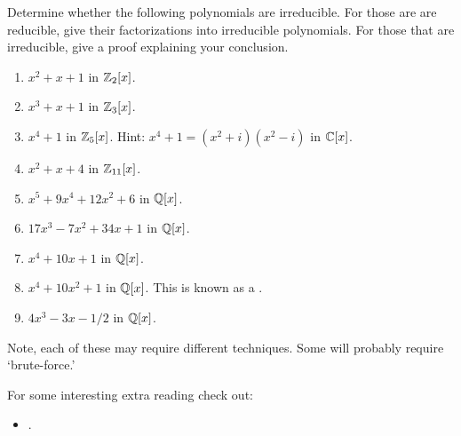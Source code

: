 \documentclass{ximera}
\begin{document}
\begin{exercise}\label{E:manypoly}
  Determine whether the following polynomials are irreducible. For those
  are are reducible, give their factorizations into irreducible
  polynomials. For those that are irreducible, give a proof explaining
  your conclusion.
  \begin{enumerate}
  \item $x^2 + x +1$ in $\mathbb Z_2[x]$.
  \item $x^3 + x + 1$ in $\mathbb Z_3[x]$.
  \item $x^4+1$ in $\mathbb Z_5[x]$. Hint: $x^4+1 = (x^2+i)(x^2-i)$ in
    $\mathbb C[x]$.
  \item $x^2 + x + 4$ in $\mathbb Z_{11}[x]$.
  \item $x^5 + 9x^4 + 12x^2 + 6$ in  $\mathbb Q[x]$.
  \item $17 x^3 - 7x^2 + 34x + 1$ in $\mathbb Q[x]$.
  \item $x^4 + 10x + 1$ in $\mathbb Q[x]$.
  \item $x^4 + 10x^2 + 1$ in $\mathbb Q[x]$. This is known as a
    .
  \item $4x^3 -3x -1/2$ in $\mathbb Q[x]$.
  \end{enumerate}
  \begin{hint}
    Note, each of these may require different techniques. Some will
    probably require `brute-force.'
  \end{hint}
\end{exercise}





For some interesting extra reading check out:
\begin{itemize}
\item {}.

\end{itemize}
\end{document}
